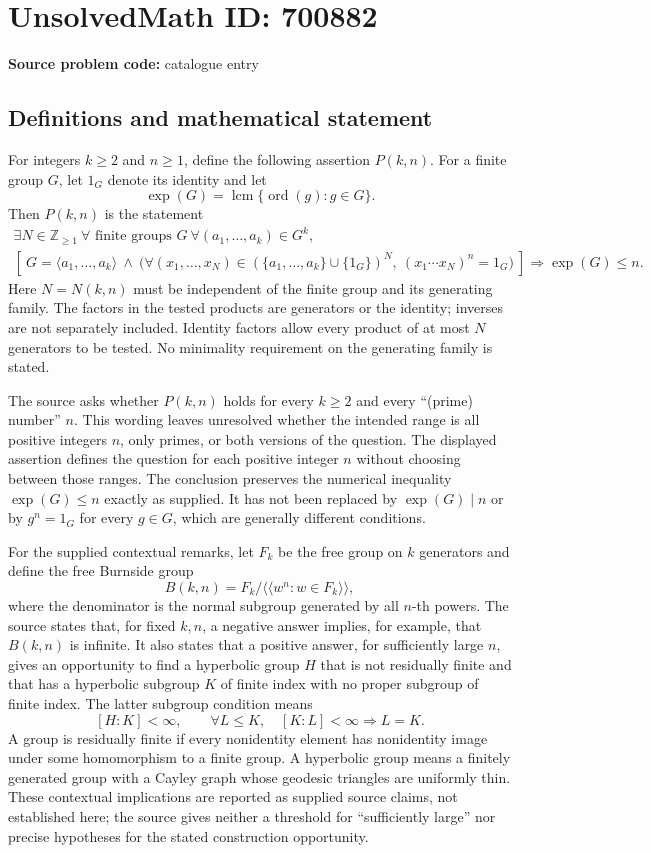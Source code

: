 \documentclass[11pt]{article}
\newcommand{\Z}{\mathbb{Z}}
\begin{document}
\section*{UnsolvedMath ID: 700882}
\textbf{Source problem code:} catalogue entry
\subsection{Definitions and mathematical statement}
For integers \(k\geq 2\) and \(n\geq 1\), define the following assertion \(P(k,n)\). For a finite group \(G\), let \(1_G\) denote its identity and let
\[
\exp(G)=\operatorname{lcm}\{\operatorname{ord}(g):g\in G\}.
\]
Then \(P(k,n)\) is the statement
\[
\begin{gathered}
\exists N\in\Z_{\geq 1}\ \forall\text{ finite groups }G\ \forall(a_1,\ldots,a_k)\in G^k,\\
\left[\ G=\langle a_1,\ldots,a_k\rangle\ \land\
\bigl(\forall(x_1,\ldots,x_N)\in
(\{a_1,\ldots,a_k\}\cup\{1_G\})^N,\
(x_1\cdots x_N)^n=1_G\bigr)\ \right]
\Longrightarrow \exp(G)\leq n.
\end{gathered}
\]
Here \(N=N(k,n)\) must be independent of the finite group and its generating family. The factors in the tested products are generators or the identity; inverses are not separately included. Identity factors allow every product of at most \(N\) generators to be tested. No minimality requirement on the generating family is stated.

The source asks whether \(P(k,n)\) holds for every \(k\geq 2\) and every ``(prime) number'' \(n\). This wording leaves unresolved whether the intended range is all positive integers \(n\), only primes, or both versions of the question. The displayed assertion defines the question for each positive integer \(n\) without choosing between those ranges. The conclusion preserves the numerical inequality \(\exp(G)\leq n\) exactly as supplied. It has not been replaced by \(\exp(G)\mid n\) or by \(g^n=1_G\) for every \(g\in G\), which are generally different conditions.

For the supplied contextual remarks, let \(F_k\) be the free group on \(k\) generators and define the free Burnside group
\[
B(k,n)=F_k/\langle\!\langle w^n:w\in F_k\rangle\!\rangle,
\]
where the denominator is the normal subgroup generated by all \(n\)-th powers. The source states that, for fixed \(k,n\), a negative answer implies, for example, that \(B(k,n)\) is infinite. It also states that a positive answer, for sufficiently large \(n\), gives an opportunity to find a hyperbolic group \(H\) that is not residually finite and that has a hyperbolic subgroup \(K\) of finite index with no proper subgroup of finite index. The latter subgroup condition means
\[
[H:K]<\infty,\qquad
\forall L\leq K,\quad [K:L]<\infty\Longrightarrow L=K.
\]
A group is residually finite if every nonidentity element has nonidentity image under some homomorphism to a finite group. A hyperbolic group means a finitely generated group with a Cayley graph whose geodesic triangles are uniformly thin. These contextual implications are reported as supplied source claims, not established here; the source gives neither a threshold for ``sufficiently large'' nor precise hypotheses for the stated construction opportunity.
\end{document}
